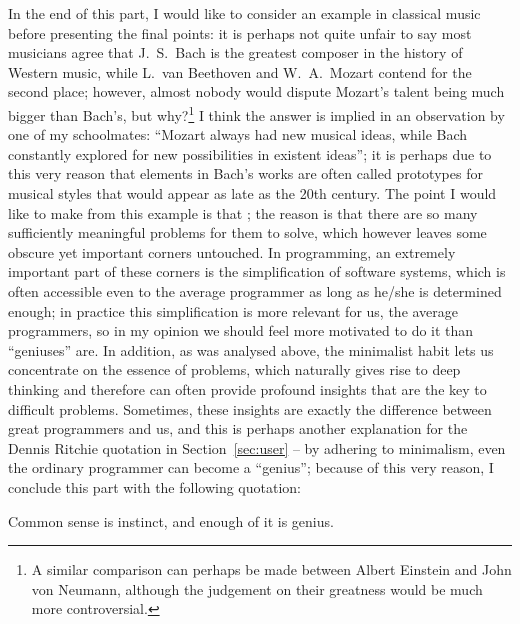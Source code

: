 In the end of this part, I would like to consider an example in classical
music before presenting the final points: it is perhaps not quite unfair
to say most musicians agree that J.~S.\ Bach is the greatest composer in
the history of Western music, while L.\ van Beethoven and W.~A.\ Mozart
contend for the second place; however, almost nobody would dispute Mozart's
talent being much bigger than Bach's, but why?\footnote{A similar comparison
can perhaps be made between Albert Einstein and John von Neumann, although the
judgement on their greatness would be much more controversial.}  I think the
answer is implied in an observation by one of my schoolmates: ``Mozart always
had new musical ideas, while Bach constantly explored for new possibilities in
existent ideas''; it is perhaps due to this very reason that elements in Bach's
works are often called prototypes for musical styles that would appear as late
as the 20th century.  The point I would like to make from this example is
that ; the reason is that
there are so many sufficiently meaningful problems for them to solve, which
however leaves some obscure yet important corners untouched.  In programming,
an extremely important part of these corners is the simplification of software
systems, which is often accessible even to the average programmer as long as
he/she is determined enough; in practice this simplification is more relevant
for us, the average programmers, so in my opinion we should feel more
motivated to do it than ``geniuses'' are.  In addition, as was analysed
above, the minimalist habit lets us concentrate on the essence of problems,
which naturally gives rise to deep thinking and therefore can often provide
profound insights that are the key to difficult problems.  Sometimes, these
insights are exactly the difference between great programmers and us, and
this is perhaps another explanation for the Dennis Ritchie quotation
in Section~\ref{sec:user} -- by adhering to minimalism, even the
ordinary programmer can become a ``genius''; because of this very
reason, I conclude this part with the following quotation:
\begin{quoting}
	Common sense is instinct, and enough of it is genius.
\end{quoting}

